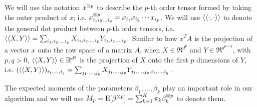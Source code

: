 We will use the notation $x^{\otimes p}$ to describe the $p$-th order tensor
formed by taking the outer product of $x$; i.e. $x^{\otimes p}_{i_1 i_2 \ldots
i_p} = x_{i_1} x_{i_2} \cdots x_{i_p}$. We will use
$\langle\langle \cdot, \cdot \rangle\rangle$ to denote the general dot product between $p$-th
order tensors, i.e. $\langle\langle X, Y \rangle\rangle = \sum_{i_1, i_2, \ldots i_p} X_{i_1,
i_2, \ldots i_p} Y_{i_1, i_2, \ldots i_p}.$ Similar to how $x^T A$ is
the projection of a vector $x$ onto the row space of a matrix $A$, when
$X \in \Re^{d^p}$ and $Y \in \Re^{d^{p+q}}$,  with $p, q > 0$,
$\langle\langle X, Y \rangle\rangle \in \mathbb{R}^{d^q}$ is the projection of $X$ onto the first
$p$ dimensions of $Y$, i.e. $(\langle\langle X, Y \rangle\rangle)_{i_1, \ldots, i_q}
= \sum_{j_1, \ldots, j_p} X_{j_1, \ldots, j_p} Y_{j_1, \ldots, j_p, i_1,
\ldots, i_q}$.

The expected moments of the parameters $\beta_1, \dots, \beta_k$ play an
important role in our algorithm and we will use $M_p = \operatorname{E}[\beta^{\otimes p}]
= \sum_{k=1}^{K} \pi_k \beta_k^{\otimes p}$ to denote them.
